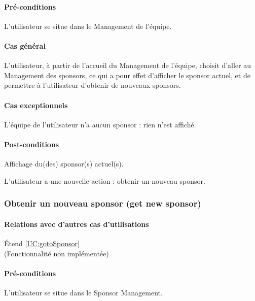 \begin{list}{}{\leftmargin=1.5em}
\paragraph{Pré-conditions}
\begin{list}{}{\leftmargin=1.5em}
\item{L'utilisateur se situe dans le Management de l'équipe.}
\end{list}
\paragraph{Cas général}
L'utilisateur, à partir de l'accueil du Management de l'équipe, choisit d'aller au Management des sponsors, ce qui a pour effet d'afficher le sponsor actuel, et de permettre à l'utilisateur d'obtenir de nouveaux sponsors. 
\paragraph{Cas exceptionnels}
L'équipe de l'utilisateur n'a aucun sponsor : rien n'est affiché. 
\paragraph{Post-conditions}
\begin{list}{}{\leftmargin=1.5em}
\item{Affichage du(des) sponsor(s) actuel(s).}
\item{L'utilisateur a une nouvelle action : obtenir un nouveau sponsor.}
\end{list}

\subsubsection{Obtenir un nouveau sponsor (get new sponsor)}
\label{UC:getNewSponsor}
\paragraph{Relations avec d'autres cas d'utilisations}
Étend \ref{UC:gotoSponsor}
\\(Fonctionnalité non implémentée)
\paragraph{Pré-conditions}
\begin{list}{}{\leftmargin=1.5em}
\item{L'utilisateur se situe dans le Sponsor Management.}
\end{list}

\end{list}
